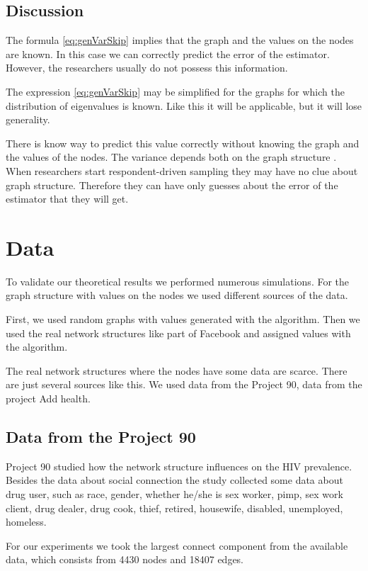 \documentclass[12pt]{report}
\begin{document}
\subsection{Discussion}

The formula \ref{eq:genVarSkip} implies that the graph and the values on the nodes are known. In this case we can correctly predict the error of the estimator. However, the researchers usually do not possess this information.

The expression \ref{eq:genVarSkip} may be simplified for the graphs for which the distribution of eigenvalues is known. Like this it will be applicable, but it will lose generality.

There is know way to predict this value correctly without knowing the graph and the values of the nodes. The variance depends both on the graph structure . When researchers start respondent-driven sampling they may have no clue about graph structure. Therefore they can have only guesses about the error of the estimator that they will get.


\section{Data}

To validate our theoretical results we performed numerous simulations. For the graph structure with values on the nodes we used different sources of the data. 

First, we used random graphs with values generated with the algorithm. 
Then we used the real network structures like part of Facebook \cite{Facebook}  and assigned values with the algorithm.

The real network structures where the nodes have some data are scarce. There are just several sources like this. We used data from the Project 90\cite{Project90}, data from the project Add health\cite{Addhealth}. 

\subsection{Data from the Project 90}
Project 90 \cite{Project90} studied how the network structure influences on the HIV prevalence. Besides the data about social connection the study collected some data about drug user, such as race, gender, whether he/she is sex worker, pimp, sex work client, drug dealer, drug cook, thief, retired, housewife, disabled, unemployed, homeless.


For our experiments we took the largest connect component from the available data, which consists from 4430 nodes and 18407 edges.
\end{document}
